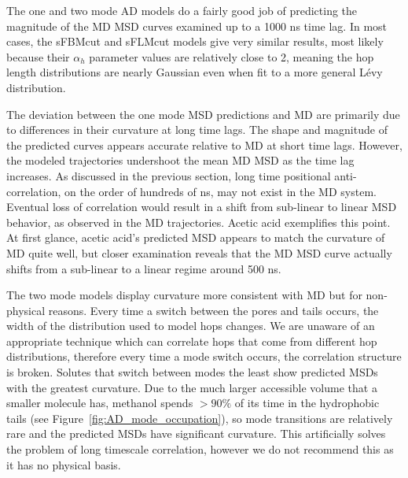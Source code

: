 \documentclass[aps,pre,preprint,groupedaddress,longbibliography]{revtex4-2}
\begin{document}
  The one and two mode AD models do a fairly good job of predicting the magnitude of 
  the MD MSD curves examined up to a 1000 ns time lag.
  In most cases, the sFBMcut and sFLMcut models give very similar results, most 
  likely because their $\alpha_h$ parameter values are relatively close to 2, meaning
  the hop length distributions are nearly Gaussian even when fit to a more general 
  L\'evy distribution. 
  
  The deviation between the one mode MSD predictions and MD are primarily due
  to differences in their curvature at long time lags. The shape and magnitude of 
  the predicted curves appears accurate relative to MD at short time lags.  
  However, the modeled trajectories undershoot the mean MD MSD as the time lag increases. As 
  discussed in the previous section, long time positional anti-correlation, on
  the order of hundreds of ns, may not exist in the MD system. 
  Eventual loss of correlation would result in a shift from sub-linear to linear 
  MSD behavior, as observed in the MD trajectories. Acetic acid exemplifies this point.
  At first glance, acetic acid's predicted MSD appears to match the curvature of MD 
  quite well, but closer examination reveals that the MD MSD curve actually shifts
  from a sub-linear to a linear regime around 500 ns.
  
  The two mode models display curvature more consistent with MD but for non-physical
  reasons. Every time a switch between the pores and tails occurs, the width of the
  distribution used to model hops changes. We are unaware of an appropriate technique which can 
  correlate hops that come from different hop distributions, therefore every 
  time a mode switch occurs, the correlation structure is broken. Solutes that
  switch between modes the least show predicted MSDs with the greatest curvature. 
  Due to the much larger accessible volume that a smaller molecule has, methanol 
  spends $>90\%$ of its time in the hydrophobic tails (see Figure~\ref{fig:AD_mode_occupation}),
  so mode transitions are relatively rare and the predicted MSDs have significant 
  curvature. This artificially solves the problem of long timescale correlation, 
  however we do not recommend this as it has no physical basis.
  
\end{document}
